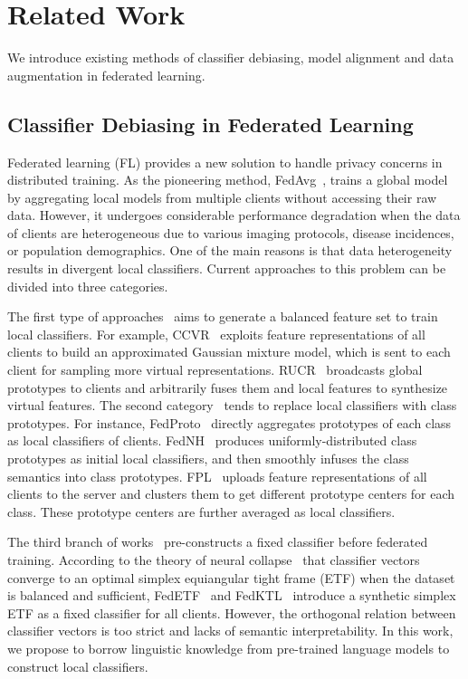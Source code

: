 \section{Related Work}
\label{sec:related-work}
We introduce existing methods of classifier debiasing, model alignment and data augmentation in federated learning.

\subsection{Classifier Debiasing in Federated Learning}
Federated learning (FL) provides a new solution to handle privacy concerns in distributed training. 
As the pioneering method, FedAvg~\cite{fedavg}, trains a global model by aggregating local models from multiple clients without accessing their raw data. However, it undergoes considerable performance degradation when the data of clients are heterogeneous due to various imaging protocols, disease incidences, or population demographics. One of the main reasons is that data heterogeneity results in divergent local classifiers. Current approaches to this problem can be divided into three categories.

The first type of approaches~\cite{luo2021no,huang2024federated,zhou2023fedfa} aims to generate a balanced feature set to train local classifiers. For example, CCVR~\cite{luo2021no} exploits feature representations of all clients to build an approximated Gaussian mixture model, which is sent to each client for sampling more virtual representations. RUCR~\cite{huang2024federated} broadcasts global prototypes to clients and arbitrarily fuses them and local features to synthesize virtual features.
The second category~\cite{huang2023rethinking, dai2023tackling, tan2022fedproto, qi2023cross, long2023fedcd} tends to replace local classifiers with class prototypes. For instance, FedProto~\cite{tan2022fedproto} directly aggregates prototypes of each class as local classifiers of clients. FedNH~\cite{dai2023tackling} produces uniformly-distributed class prototypes as initial local classifiers, and then smoothly infuses the class semantics into class prototypes. FPL~\cite{huang2023rethinking} uploads feature representations of all clients to the server and clusters them to get different prototype centers for each class. These prototype centers are further averaged as local classifiers.

The third branch of works~\cite{fedETF, zhang2024upload} pre-constructs a fixed classifier before federated training. According to the theory of neural collapse~\cite{papyan2020prevalence} that classifier vectors converge to an optimal simplex equiangular tight frame (ETF) when the dataset is balanced and sufficient, FedETF~\cite{fedETF} and FedKTL~\cite{zhang2024upload} introduce a synthetic simplex ETF as a fixed classifier for all clients. However, the orthogonal relation between classifier vectors is too strict and lacks of semantic interpretability. In this work, we propose to borrow linguistic knowledge from pre-trained language models to construct local classifiers.  

